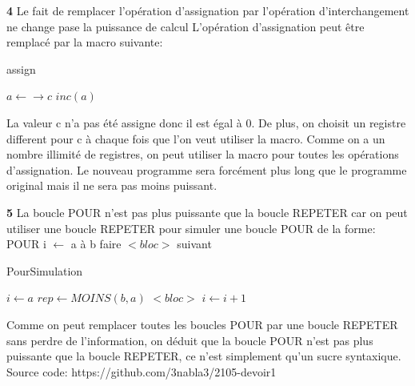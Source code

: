 \documentclass{article}
\begin{document}
    \textbf{4}
    Le fait de remplacer l'opération d'assignation par l'opération  d'interchangement ne change pase la puissance de calcul
    L'opération d'assignation peut être remplacé par la macro suivante:
    
    \begin{algorithm}[H]
        \caption{assign}\label{assign}
        \begin{algorithmic}
        \State $\textit{$a$} \leftarrow \rightarrow \textit{$c$}$
            \State $inc(a)$
        \EndFor
        \EndProcedure
        \end{algorithmic}
    \end{algorithm}

    La valeur c n'a pas été assigne donc il est égal à 0.
    De plus, on choisit un registre different pour c à chaque fois que l'on veut utiliser la macro.
    Comme on a un nombre illimité de registres, on peut utiliser la macro pour toutes les opérations d'assignation.
    Le nouveau programme sera forcément plus long que le programme original mais il ne sera pas moins puissant.

    \textbf{5}
    La boucle POUR n'est pas plus puissante que la boucle REPETER car on peut utiliser une boucle REPETER pour
    simuler une boucle POUR de la forme:\newline
    POUR i $\leftarrow$ a à b faire $<bloc>$ suivant

    \begin{algorithm}[H]
        \caption{PourSimulation}\label{PourSimulation}
        \begin{algorithmic}
        \State $\textit{$i$} \gets a$
        \State $\textit{$rep$} \gets MOINS(b, a)$
            \State $<bloc>$
            \State $\textit{$i$} \gets i + 1$
        \EndFor
        \EndProcedure
        \end{algorithmic}
    \end{algorithm}

    Comme on peut remplacer toutes les boucles POUR par une boucle REPETER sans perdre de l'information, 
    on déduit que la boucle POUR n'est pas plus puissante que la boucle REPETER, ce n'est simplement qu'un sucre syntaxique.\newline \newline \newline
    Source code: https://github.com/3nabla3/2105-devoir1
\end{document}

